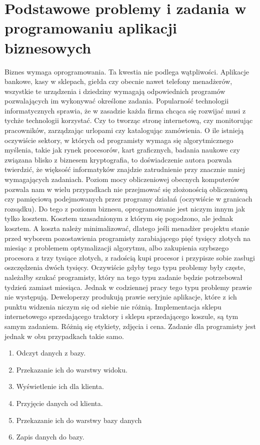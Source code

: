 \documentclass[a4paper,10pt]{report}
\begin{document}
\section{Podstawowe problemy i zadania w programowaniu aplikacji biznesowych}
Biznes wymaga oprogramowania. Ta kwestia nie podlega wątpliwości. Aplikacje bankowe, kasy w sklepach, giełda czy obecnie nawet telefony menadżerów, wszystkie te urządzenia i dziedziny wymagają odpowiednich programów pozwalających im wykonywać określone zadania. Popularność technologii informatycznych sprawia, że w zasadzie każda firma chcąca się rozwijać musi z tychże technologii korzystać. Czy to tworząc stronę internetową, czy monitorując pracowników, zarządzając urlopami czy katalogując zamówienia. O ile istnieją oczywiście sektory, w których od programisty wymaga się algorytmicznego myślenia, takie jak rynek procesorów, kart graficznych, badania naukowe czy związana blisko z biznesem kryptografia, to doświadczenie autora pozwala twierdzić, że więksość informatyków znajdzie zatrudnienie przy znacznie mniej wymagających zadaniach. Poziom mocy obliczeniowej obecnych komputerów pozwala nam w wielu przypadkach nie przejmować się złożonością obliczeniową czy pamięciową podejmowanych przez programy działań (oczywiście w granicach rozsądku). Do tego z poziomu biznesu, oprogramowanie jest niczym innym jak tylko kosztem. Kosztem uzasadnionym z którym się pogodzono, ale jednak kosztem. A koszta należy minimalizować, dlatego jeśli menadżer projektu stanie przed wyborem pozostawienia programisty zarabiającego pięć tysięcy złotych na miesiąc z problemem optymalizacji algorytmu, albo zakupienia szybszego procesora z trzy tysiące złotych, z radością kupi procesor i przypisze sobie zasługi oszczędzenia dwóch tysięcy. Oczywiście gdyby tego typu problemy były częste, należałby szukać programisty, który na tego typu zadanie będzie potrzebował tydzień zamiast miesiąca. Jednak w codziennej pracy tego typu problemy prawie nie występują. Deweloperzy produkują prawie seryjnie aplikacje, które z ich punktu widzenia niczym się od siebie nie różnią. Implementacja sklepu internetowego sprzedającego traktory i sklepu sprzedającego koszule, są tym samym zadaniem. Różnią się etykiety, zdjęcia i cena. Zadanie dla programisty jest jednak w obu przypadkach takie samo. 
\begin{enumerate}
	\item Odczyt danych z bazy. 
	\item Przekazanie ich do warstwy widoku. 
	\item Wyświetlenie ich dla klienta.
	\item Przyjęcie danych od klienta.
	\item Przekazanie ich do warstwy bazy danych
	\item Zapis danych do bazy.
\end{enumerate}
\end{document}
